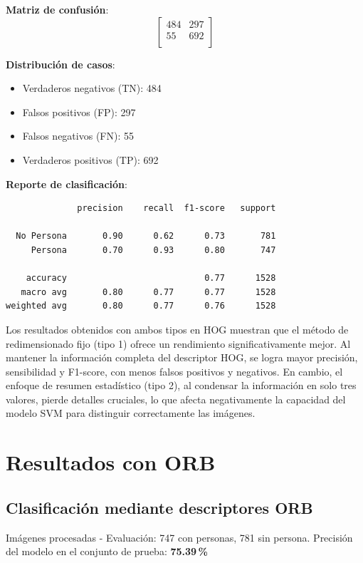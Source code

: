 \documentclass[a4paper]{article}
\begin{document}
\textbf{Matriz de confusión}:
\[
\begin{bmatrix}
484 & 297 \\
55 & 692 \\
\end{bmatrix}
\]

\textbf{Distribución de casos}:
\begin{itemize}
    \item Verdaderos negativos (TN): 484
    \item Falsos positivos (FP): 297
    \item Falsos negativos (FN): 55
    \item Verdaderos positivos (TP): 692
\end{itemize}

\textbf{Reporte de clasificación}:

\begin{verbatim}
              precision    recall  f1-score   support

  No Persona       0.90      0.62      0.73       781
     Persona       0.70      0.93      0.80       747

    accuracy                           0.77      1528
   macro avg       0.80      0.77      0.77      1528
weighted avg       0.80      0.77      0.76      1528
\end{verbatim}

Los resultados obtenidos con ambos tipos en HOG muestran que el método de redimensionado 
fijo (tipo 1) ofrece un rendimiento significativamente mejor. Al mantener la información 
completa del descriptor HOG, se logra mayor precisión, sensibilidad y F1-score, con menos 
falsos positivos y negativos. En cambio, el enfoque de resumen estadístico (tipo 2), al 
condensar la información en solo tres valores, pierde detalles cruciales, lo que afecta negativamente 
la capacidad del modelo SVM para distinguir correctamente las imágenes.


\vspace{0.5cm}
\section{Resultados con ORB}

\subsection*{Clasificación mediante descriptores ORB}

Imágenes procesadas - Evaluación: 747 con personas, 781 sin persona.  
Precisión del modelo en el conjunto de prueba: \textbf{75.39\,\%}
\end{document}
